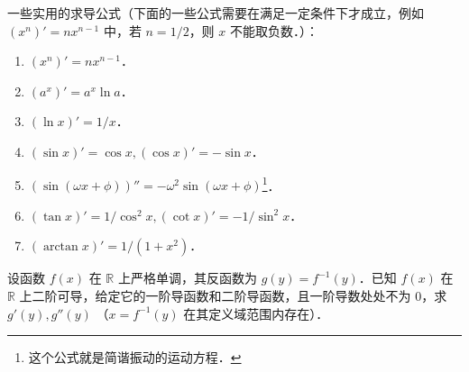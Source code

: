 一些实用的求导公式（下面的一些公式需要在满足一定条件下才成立，例如 $(x^n)'=nx^{n-1}$ 中，若 $n=1/2$，则 $x$ 不能取负数．）：
\begin{enumerate}
\item $(x^n)'=nx^{n-1}$．
\item $(a^x)'=a^x\ln a$．
\item $(\ln x)'=1/x$．
\item $(\sin x)'=\cos x,(\cos x)'=-\sin x$．\item $(\sin(\omega x+\phi))''=-\omega^2\sin(\omega x+\phi)$\footnote{这个公式就是简谐振动的运动方程．}．
\item $(\tan x)'=1/\cos^2 x,(\cot x)'=-1/\sin^2 x$．
\item $(\arctan x)'=1/(1+x^2)$．
\end{enumerate}
\begin{exercise}{}
设函数 $f(x)$ 在 $\mathbb{R}$ 上严格单调，其反函数为 $g(y)=f^{-1}(y)$．已知 $f(x)$ 在 $\mathbb{R}$ 上二阶可导，给定它的一阶导函数和二阶导函数，且一阶导数处处不为 $0$，求 $g'(y),g''(y)$ （$x=f^{-1}(y)$ 在其定义域范围内存在）．


\end{exercise}
